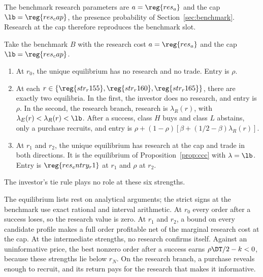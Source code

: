 The benchmark research parameters are \(a=\reg{res_a}\) and the cap \(\lb=\reg{res_cap}\), the presence
probability of Section~\ref{sec:benchmark}. Research at the cap therefore reproduces the benchmark slot.

\begin{proposition}\label{prop:research}
Take the benchmark \(B\) with the research cost \(a=\reg{res_a}\) and the cap \(\lb=\reg{res_cap}\).
\begin{enumerate}[label=(\roman*),leftmargin=2em]
\item At \(r_0\), the unique equilibrium has no research and no trade. Entry is \(\rho\).
\item At each \(r\in\{\reg{str_r155},\reg{str_r160},\reg{str_r165}\}\), there are exactly two equilibria. In the
first, the investor does no research, and entry is \(\rho\). In the second, the research branch, research is
\(\lambda_R(r)\), with \(\lambda_E(r)<\lambda_R(r)<\lb\). After a success, class \(H\) buys and class \(L\) abstains,
only a purchase recruits, and entry is \(\rho+(1-\rho)[\beta+(1/2-\beta)\lambda_R(r)]\).
\item At \(r_1\) and \(r_2\), the unique equilibrium has research at the cap and trade in both directions. It is the
equilibrium of Proposition~\ref{prop:ccc} with \(\lambda=\lb\). Entry is \(\reg{res_entry_r1}\) at \(r_1\) and
\(\rho\) at \(r_2\).
\end{enumerate}
The investor's tie rule plays no role at these six strengths.
\end{proposition}

The equilibrium lists rest on analytical arguments; the strict signs at the benchmark use exact rational and
interval arithmetic. At \(r_0\) every order after a success loses, so the research value is zero. At \(r_1\) and
\(r_2\), a bound on every candidate profile makes a full order profitable net of the marginal research cost at
the cap. At the intermediate strengths, no research confirms itself. Against an uninformative price,
the best nonzero order after a success earns \(\rho\DT/2-k<0\), because these strengths lie below \(r_N\). On the
research branch, a purchase reveals enough to recruit, and its return pays for the research that makes it
informative.


